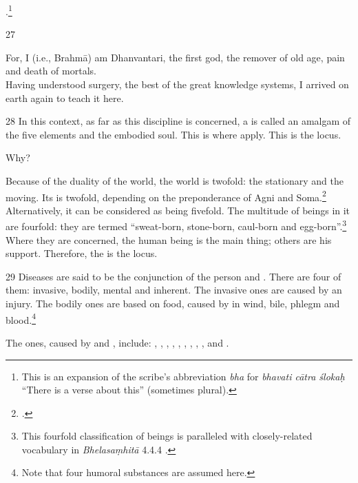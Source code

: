 \begin{translation}
    .\footnote{This is an expansion 
    of the scribe's abbreviation \emph{bha} for \emph{bhavati cātra ślokaḥ} 
    “There is a verse about this” (sometimes plural).\label{bha}}
    
    \item[27]           
    \begin{sloka}
        For, I (i.e., Brahmā) am Dhanvantari, the first god, the remover of old age, 
        pain and 
        death of mortals.\\ Having understood surgery, the best of the great 
        knowledge 
        systems, I arrived on earth again to teach it here.
    \end{sloka}    
    
    
    \item[28] In this context, as far as this discipline is concerned, a 
     is called an amalgam of the five elements 
    and the embodied soul.  This is where  apply. This 
    is the locus. 
    
    Why?
    
    Because of the duality of the world, the world is twofold: the stationary
    and the moving. Its  is twofold, depending on the
    preponderance of Agni and Soma.\footcite[See][]{wuja-2004}  Alternatively,
    it can be considered as being fivefold.  The multitude of beings in it are
    fourfold: they are termed “sweat-born, stone-born, caul-born and
    egg-born”.\footnote{This fourfold classification of beings is paralleled
    with closely-related vocabulary in  \emph{Bhelasaṃhitā} 4.4.4	
    \parencites[206]{kris-2000}[81]{mook-1921}.}  Where they are concerned, the
    human being is the main thing; others are his support.  Therefore, the
     is the locus.
    
    \item[29]  Diseases are said to be the conjunction of the person and 
    .
    There are four of them: invasive, bodily, mental and inherent.  The invasive ones 
    are caused by an injury.  The bodily ones are based on food, caused by 
     in wind, bile, phlegm and blood.\footnote{Note 
    that four humoral substances are assumed here.} 
    
    The  ones, caused by 
     and 
    , 
    include:  
    , 
    , 
    , 
    , 
    , 
    ,
    ,
    ,
    , 
    and
    .
    

\end{translation}
